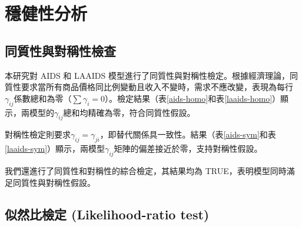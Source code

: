 
\section{穩健性分析}

\subsection{同質性與對稱性檢查}




本研究對 AIDS 和 LAAIDS 模型進行了同質性與對稱性檢定。根據經濟理論，同質性要求當所有商品價格同比例變動且收入不變時，需求不應改變，表現為每行\(\gamma_{ij}\)係數總和為零（\(\sum \gamma_i = 0\)）。檢定結果（表\ref{aids-homo}和表\ref{laaids-homo}）顯示，兩模型的\(\gamma_{ij}\)總和均精確為零，符合同質性假設。

對稱性檢定則要求\(\gamma_{ij} = \gamma_{ji}\)，即替代關係具一致性。結果（表\ref{aids-sym}和表\ref{laaids-sym}）顯示，兩模型\(\gamma_{ij}\)矩陣的偏差接近於零，支持對稱性假設。

我們還進行了同質性和對稱性的綜合檢定，其結果均為 TRUE，表明模型同時滿足同質性與對稱性假設。


\subsection{似然比檢定 (Likelihood-ratio test)}


